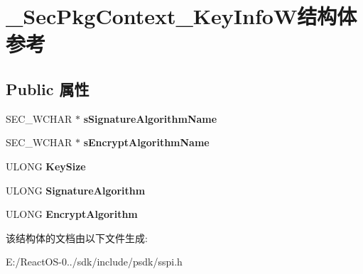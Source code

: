 \hypertarget{struct___sec_pkg_context___key_info_w}{}\section{\+\_\+\+Sec\+Pkg\+Context\+\_\+\+Key\+Info\+W结构体 参考}
\label{struct___sec_pkg_context___key_info_w}
\subsection*{Public 属性}
\begin{DoxyCompactItemize}
\item 
\mbox{\label{struct___sec_pkg_context___key_info_w_a9c22bd1de4cc04a53e39997ccb3b7375}} 
S\+E\+C\+\_\+\+W\+C\+H\+AR $\ast$ {\bfseries s\+Signature\+Algorithm\+Name}
\item 
\mbox{\label{struct___sec_pkg_context___key_info_w_a0e818d6510b718f67b4311d7c1ba5d41}} 
S\+E\+C\+\_\+\+W\+C\+H\+AR $\ast$ {\bfseries s\+Encrypt\+Algorithm\+Name}
\item 
\mbox{\label{struct___sec_pkg_context___key_info_w_a7013c1309ddb52d6f69374d35686029a}} 
U\+L\+O\+NG {\bfseries Key\+Size}
\item 
\mbox{\label{struct___sec_pkg_context___key_info_w_a44e72a1b465750f8afb5d917eda6ad24}} 
U\+L\+O\+NG {\bfseries Signature\+Algorithm}
\item 
\mbox{\label{struct___sec_pkg_context___key_info_w_a59605a1f9a4ad96adc236a875d5895bb}} 
U\+L\+O\+NG {\bfseries Encrypt\+Algorithm}
\end{DoxyCompactItemize}


该结构体的文档由以下文件生成\+:\begin{DoxyCompactItemize}
\item 
E\+:/\+React\+O\+S-\/0../sdk/include/psdk/sspi.\+h\end{DoxyCompactItemize}
